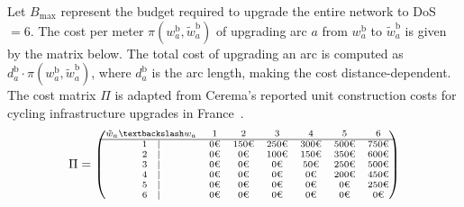 \documentclass[lettersize,journal]{IEEEtran}
\begin{document}
 Let $B_{\text{max}}$ represent the budget required to upgrade the entire network to DoS $=6$. The cost per meter $\pi(w_a^\mathrm{b}, \tilde{w}_a^\mathrm{b})$ of upgrading arc $a$ from $w_a^\mathrm{b}$ to $\tilde{w}_a^\mathrm{b}$ is given by the matrix below. The total cost of upgrading an arc is computed as $d_a^\mathrm{b} \cdot \pi(w_a^\mathrm{b}, \tilde{w}_a^\mathrm{b})$, where $d_a^\mathrm{b}$ is the arc length, making the cost distance-dependent. The cost matrix $\Pi$ is adapted from Cerema’s reported unit construction costs for cycling
infrastructure upgrades in France~\cite{cerema2024_cost}.
\renewcommand{\arraystretch}{0.8} %
\setlength{\tabcolsep}{3pt} %
\begin{equation}
  \Pi =
  \scriptsize
  \begin{pmatrix} %
    \tilde{w}_{a} \textbackslash w_{a} & 1 & 2 & 3 & 4 & 5 & 6 \\ \hline
    1 \quad      \vert & 0\text{€}   & 150\text{€}  & 250\text{€}  & 300\text{€}  & 500\text{€}  & 750\text{€}  \\
    2 \quad   \vert & 0\text{€}   & 0\text{€}    & 100\text{€}  & 150\text{€}  & 350\text{€}  & 600\text{€}  \\
    3 \quad  \vert & 0\text{€}   & 0\text{€}    & 0\text{€}    & 50\text{€}   & 250\text{€}  & 500\text{€}  \\
    4 \quad  \vert & 0\text{€}   & 0\text{€}    & 0\text{€}    & 0\text{€}    & 200\text{€}  & 450\text{€}  \\
    5 \quad  \vert & 0\text{€}   & 0\text{€}    & 0\text{€}    & 0\text{€}    & 0\text{€}    & 250\text{€}  \\
    6 \quad \vert& 0\text{€}   & 0\text{€}    & 0\text{€}    & 0\text{€}    & 0\text{€}    & 0\text{€}    \\
  \end{pmatrix}
\end{equation}
\end{document}
